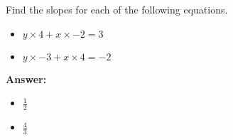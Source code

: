 Find the slopes for each of the following equations. \begin{itemize}\item \( y \times 4 + x \times -2 = 3 \)\item \( y \times -3 + x \times 4 = -2 \)\end{itemize}

        \textbf{Answer:} \begin{itemize}\item \( \frac{1}{2} \)\item \( \frac{4}{3} \)\end{itemize}
